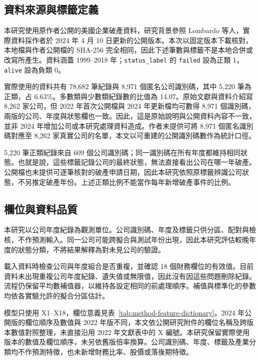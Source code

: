 \subsection{資料來源與標籤定義}

本研究使用原作者公開的美國企業破產資料，研究背景參照 Lombardo 等人\autocite{lombardo2022bankruptcy}，實際資料採作者於 2024 年 4 月 10 日更新的公開版本\autocite{sowide-bankruptcy-data}。本次以固定版本下載核對，本地檔與作者公開檔的 SHA-256 完全相同，因此下述筆數與標籤不是本地合併或改寫所產生。資料涵蓋 1999--2018 年；\nolinkurl{status_label} 的 \nolinkurl{failed} 設為正類 1，\nolinkurl{alive} 設為負類 0。

實際使用的資料共有 78,682 筆紀錄與 8,971 個匿名公司識別碼，其中 5,220 筆為正類，占 6.63\%。多數類與少數類紀錄數的比值為 14.07。原始文獻與資料介紹寫 8,262 家公司，但 2022 年首次公開檔與 2024 年更新檔均可數得 8,971 個識別碼，兩版的公司、年度與狀態欄也一致。因此，這是原始說明與公開資料內容不一致，並非 2024 年增加公司或本研究處理資料造成。作者未提供可將 8,971 個匿名識別碼對應至 8,262 家真實公司的名單，本文以可重建的公開識別碼數作為統計口徑。

5,220 筆正類紀錄來自 609 個公司識別碼；同一識別碼在所有年度都維持相同狀態。也就是說，這些標籤記錄公司的最終狀態，無法直接看出公司在哪一年破產。公開檔也未提供可逐筆核對的破產申請日期，因此本研究依照原標籤辨識公司狀態，不另推定破產年份。上述正類比例不能當作每年新增破產事件的比例。

\subsection{欄位與資料品質}

本研究以公司年度紀錄為觀測單位。公司識別碼、年度及標籤只供分區、配對與檢核，不作預測輸入。同一公司可能跨擬合與測試年份出現，因此本研究評估較晚年度的狀態分類，不將結果解釋為對未見公司的驗證。

載入資料時檢查公司與年度組合是否重複，並確認 18 個財務欄位的有效值。目前資料未出現重複公司年度紀錄、遺失值或無限值，因此沒有因這些問題刪除紀錄。流程仍保留平均數補值器，以維持各設定相同的前處理順序。補值與標準化的參數均依各實驗允許的擬合分區估計。

模型只使用 X1--X18，欄位意義見表~\ref{tab:method-feature-dictionary}。2024 年公開版的欄位順序及數值與 2022 年版不同，本文依公開研究附件的欄位名稱及跨版本數值對照整理，未直接沿用 2022 年文獻表中的 X 編號\autocite{sowide-financial-supplement}。本研究保留實際使用版本的數值及欄位順序，未另依舊版倍率換算。公司識別碼、年度、標籤及產業分類均不作預測特徵，也未新增財務比率、股價或落後期特徵。

